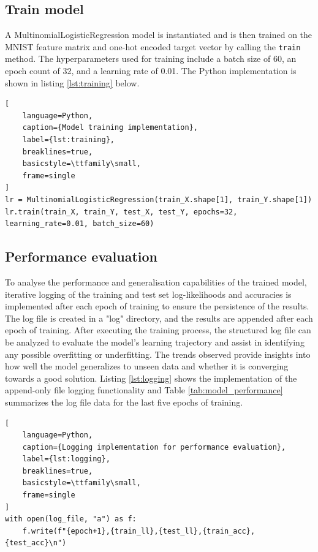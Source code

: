 \documentclass[11pt]{article}
\begin{document}
\subsection*{Train model}
A MultinomialLogisticRegression model is instantiated and is then trained on the MNIST feature matrix and one-hot encoded target vector by calling the \texttt{train} method.
The hyperparameters used for training include a batch size of 60, an epoch count of 32, and a learning rate of 0.01.
The Python implementation is shown in listing \ref{lst:training} below.

 \begin{lstlisting}[
    language=Python, 
    caption={Model training implementation},
    label={lst:training},
    breaklines=true,
    basicstyle=\ttfamily\small,
    frame=single
]
lr = MultinomialLogisticRegression(train_X.shape[1], train_Y.shape[1])
lr.train(train_X, train_Y, test_X, test_Y, epochs=32, learning_rate=0.01, batch_size=60)
\end{lstlisting}

\subsection*{Performance evaluation}
To analyse the performance and generalisation capabilities of the trained model, iterative logging of the training and test set log-likelihoods and accuracies is implemented after each epoch of training to ensure the persistence of the results.
The log file is created in a "log" directory, and the results are appended after each epoch of training.
After executing the training process, the structured log file can be analyzed to evaluate the model's learning trajectory and assist in identifying any possible overfitting or underfitting. The trends observed provide insights into how well the model generalizes to unseen data and whether it is converging towards a good solution.
Listing \ref{lst:logging} shows the implementation of the append-only file logging functionality and Table \ref{tab:model_performance} summarizes the log file data for the last five epochs of training. 

 \begin{lstlisting}[
    language=Python, 
    caption={Logging implementation for performance evaluation},
    label={lst:logging},
    breaklines=true,
    basicstyle=\ttfamily\small,
    frame=single
]
with open(log_file, "a") as f:
    f.write(f"{epoch+1},{train_ll},{test_ll},{train_acc},{test_acc}\n")
\end{lstlisting}
\end{document}
